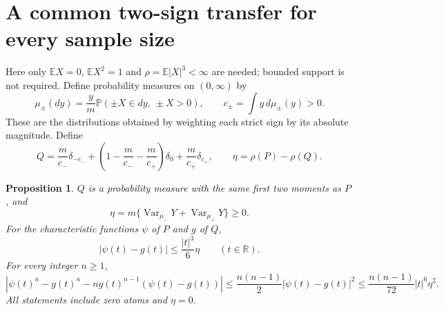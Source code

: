 \documentclass[11pt,a4paper]{article}
\newtheorem{theorem}{Proposition}
\newcommand{\E}{\mathbb E}
\newcommand{\Pp}{\mathbb P}
\newcommand{\R}{\mathbb R}
\begin{document}
\section{A common two-sign transfer for every sample size}
Here only $\E X=0$, $\E X^2=1$ and $\rho=\E|X|^3<\infty$ are needed;
bounded support is not required. Define probability measures on $(0,\infty)$ by
\[
 \mu_\pm(dy)=\frac y m\Pp(\pm X\in dy,\ \pm X>0),
 \qquad c_\pm=\int y\,d\mu_\pm(y)>0.
\]
These are the distributions obtained by weighting each strict sign by its
absolute magnitude. Define
\[
 Q=\frac m{c_-}\delta_{-c_-}
  +\left(1-\frac m{c_-}-\frac m{c_+}\right)\delta_0
  +\frac m{c_+}\delta_{c_+},\qquad
 \eta=\rho(P)-\rho(Q).
\]
\begin{theorem}\label{v10:primitive:transfer}
$Q$ is a probability measure with the same first two moments as $P$,
and
\begin{equation}\label{v10:primitive:variance}
 \eta=m\{\operatorname{Var}_{\mu_-}Y+
                  \operatorname{Var}_{\mu_+}Y\}\ge0.
\end{equation}
For the characteristic functions $\psi$ of $P$ and $g$ of $Q$,
\begin{equation}\label{v10:primitive:char}
 |\psi(t)-g(t)|\le\frac{|t|^3}{6}\eta\qquad(t\in\R).
\end{equation}
For every integer $n\ge1$,
\begin{equation}\label{v10:primitive:power}
 |\psi(t)^n-g(t)^n-ng(t)^{n-1}(\psi(t)-g(t))|
 \le\frac{n(n-1)}2|\psi(t)-g(t)|^2
 \le\frac{n(n-1)}{72}|t|^6\eta^2.
\end{equation}
All statements include zero atoms and $\eta=0$.
\end{theorem}
\end{document}
